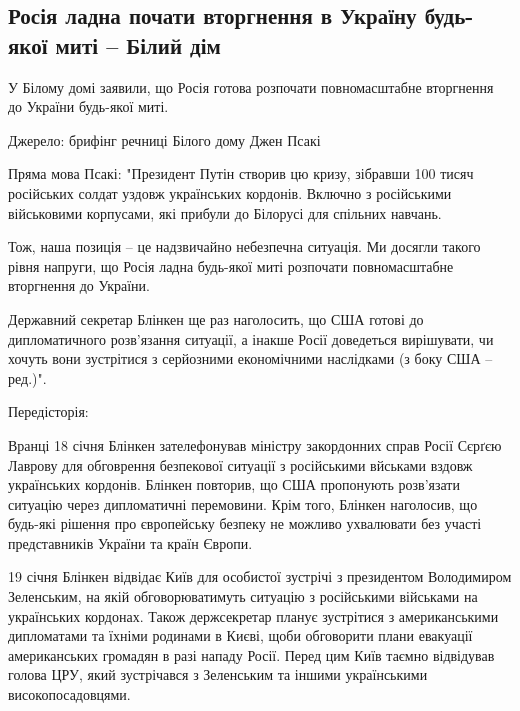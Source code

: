  
 
 
 
 
\subsection{Росія ладна почати вторгнення в Україну будь-якої миті – Білий дім}
\label{sec:18_01_2022.stz.news.ua.pravda.1.rossia_ugroza}


У Білому домі заявили, що Росія готова розпочати повномасштабне вторгнення до
України будь-якої миті.

Джерело: брифінг речниці Білого дому Джен Псакі

Пряма мова Псакі: "Президент Путін створив цю кризу, зібравши 100 тисяч
російських солдат уздовж українських кордонів. Включно з російськими
військовими корпусами, які прибули до Білорусі для спільних навчань.


Тож, наша позиція – це надзвичайно небезпечна ситуація. Ми досягли такого рівня
напруги, що Росія ладна будь-якої миті розпочати повномасштабне вторгнення до
України.

Державний секретар Блінкен ще раз наголосить, що США готові до дипломатичного
розв’язання ситуації, а інакше Росії доведеться вирішувати, чи хочуть вони
зустрітися з серйозними економічними наслідками (з боку США – ред.)".

Передісторія: 

Вранці 18 січня Блінкен зателефонував міністру закордонних справ Росії
Сєрґєю Лаврову для обговрення безпекової ситуації з російськими вйськами
вздовж українських кордонів. Блінкен повторив, що США пропонують розв’язати
ситуацію через дипломатичні перемовини. Крім того, Блінкен наголосив, що
будь-які рішення про європейську безпеку не можливо ухвалювати без участі
представників України та країн Європи.

19 січня Блінкен відвідає Київ для особистої зустрічі з президентом
Володимиром Зеленським, на якій обговорюватимуть ситуацію з російськими
військами на українських кордонах. Також держсекретар планує зустрітися з
американськими дипломатами та їхніми родинами в Києві, щоби обговорити
плани евакуації американських громадян в разі нападу Росії. Перед цим Київ
таємно відвідував голова ЦРУ, який зустрічався з Зеленським та іншими
українськими високопосадовцями.

